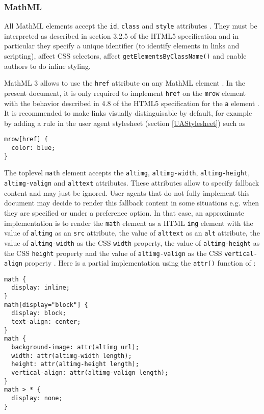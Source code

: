 \subsubsection{MathML}

All MathML elements accept the {\tt id}, {\tt class} and {\tt style} attributes
\cite{MathML3}. They must be interpreted as described in section 3.2.5 of the
HTML5 specification \cite{HTML5} and in particular they specify a unique
identifier (to identify elements in links and scripting), affect
CSS selectors, affect {\tt getElementsByClassName()} and enable authors to do
inline styling.

MathML 3 allows to use the {\tt href} attribute on any MathML element
\cite{MathML3}. In the present document, it is only required to implement
{\tt href} on the {\tt mrow} element with the behavior described in 4.8
of the HTML5 specification for the {\tt a} element \cite{HTML5}. It is
recommended to make links visually distinguisable by default, for example by
adding a rule in the user agent stylesheet (section \ref{UAStylesheet}) such as
\begin{lstlisting}
mrow[href] {
  color: blue;
}
\end{lstlisting}

The toplevel {\tt math} element accepts the {\tt altimg}, {\tt altimg-width},
{\tt altimg-height}, {\tt altimg-valign} and {\tt alttext} attributes.
These attributes allow to specify fallback content and may just be ignored.
User agents that do not fully implement this document may decide to
render this fallback content in some situations e.g. when they are specified or
under a preference option. In that case, an approximate implementation is to
render the {\tt math} element as a HTML {\tt img} element with the
value of {\tt altimg} as an {\tt src} attribute, the value of
{\tt alttext} as an {\tt alt} attribute, the value of {\tt altimg-width} as
the CSS {\tt width} property, the value of {\tt altimg-height} as
the CSS {\tt height} property and the value of {\tt altimg-valign} as
the CSS {\tt vertical-align} property \cite{HTML5} \cite{CSS2}. Here is a
partial implementation using the {\tt attr()} function of \cite{CSS3Values}:
%
\begin{lstlisting}
math {
  display: inline;
}
math[display="block"] {
  display: block;
  text-align: center;
}
math {
  background-image: attr(altimg url);
  width: attr(altimg-width length);
  height: attr(altimg-height length);
  vertical-align: attr(altimg-valign length);
}
math > * {
  display: none;
}
\end{lstlisting}

